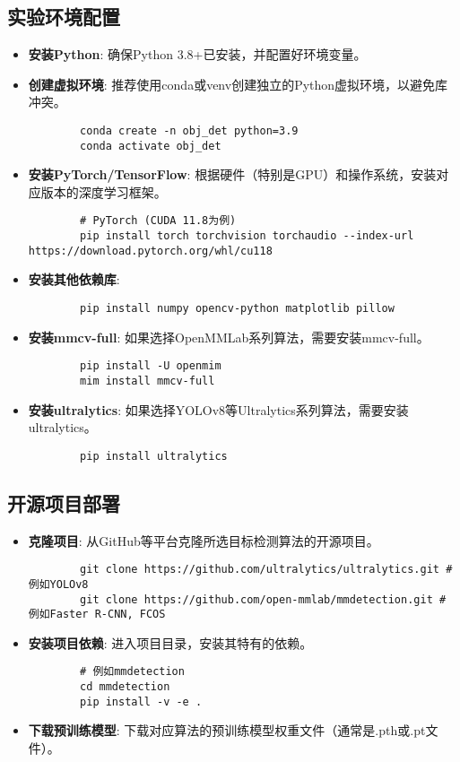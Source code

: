 \subsection{实验环境配置}
\begin{itemize}
    \item \textbf{安装Python}: 确保Python 3.8+已安装，并配置好环境变量。
    \item \textbf{创建虚拟环境}: 推荐使用conda或venv创建独立的Python虚拟环境，以避免库冲突。
    \begin{verbatim}
        conda create -n obj_det python=3.9
        conda activate obj_det
    \end{verbatim}
    \item \textbf{安装PyTorch/TensorFlow}: 根据硬件（特别是GPU）和操作系统，安装对应版本的深度学习框架。
    \begin{verbatim}
        # PyTorch (CUDA 11.8为例)
        pip install torch torchvision torchaudio --index-url https://download.pytorch.org/whl/cu118
    \end{verbatim}
    \item \textbf{安装其他依赖库}:
    \begin{verbatim}
        pip install numpy opencv-python matplotlib pillow
    \end{verbatim}
    \item \textbf{安装mmcv-full}: 如果选择OpenMMLab系列算法，需要安装mmcv-full。
    \begin{verbatim}
        pip install -U openmim
        mim install mmcv-full
    \end{verbatim}
    \item \textbf{安装ultralytics}: 如果选择YOLOv8等Ultralytics系列算法，需要安装ultralytics。
    \begin{verbatim}
        pip install ultralytics
    \end{verbatim}
\end{itemize}

\subsection{开源项目部署}
\begin{itemize}
    \item \textbf{克隆项目}: 从GitHub等平台克隆所选目标检测算法的开源项目。
    \begin{verbatim}
        git clone https://github.com/ultralytics/ultralytics.git # 例如YOLOv8
        git clone https://github.com/open-mmlab/mmdetection.git # 例如Faster R-CNN, FCOS
    \end{verbatim}
    \item \textbf{安装项目依赖}: 进入项目目录，安装其特有的依赖。
    \begin{verbatim}
        # 例如mmdetection
        cd mmdetection
        pip install -v -e .
    \end{verbatim}
    \item \textbf{下载预训练模型}: 下载对应算法的预训练模型权重文件（通常是.pth或.pt文件）。
\end{itemize}

